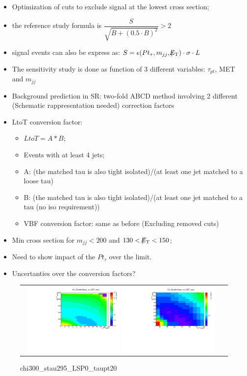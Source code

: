 \begin{itemize}
	\item Optimization of cuts to exclude signal at the lowest cross section;
	\item the reference study formula is $\dfrac{S}{\sqrt{B + (0.5 \cdot B)^{2}}} > 2$
	\item signal events can also be express as: $S = \epsilon ( Pt_{\tau} , m_{jj} ,  \slash\mkern-12mu{E}_{\text{T}} )\cdot \sigma \cdot L$
	\item The sensitivity study is done as function of 3 different variables: $\tau_{pt}$, MET and $m_{jj}$
	\item Background prediction in SR: two-fold ABCD method involving 2 different (Schematic rappresentation needed) correction factors
	\item LtoT conversion factor:
	\begin{itemize}
		\item $LtoT = A * B$;
		\item Events with at least 4 jets;
		\item A: (the matched tau is also tight isolated)/(at least one jet matched to a loose tau)
		\item B: (the matched tau is also tight isolated)/(at least one jet matched to a tau (no iso requirement))
		\item VBF conversion factor: same as before (Excluding removed cuts)
	\end{itemize}
		\item Min cross section for $m_{jj} < 200$ and $130 < \slash\mkern-12mu{E}_{\text{T}} < 150$;
		\item Need to show impact of the $Pt_{\tau}$ over the limit.
		\item Uncertanties over the conversion factors?
\end{itemize}

\begin{figure}[tbh!]
	\centering
	\begin{tabular}{cc}
		\includegraphics[width=0.48\textwidth]{analysis/pics/chi300_stau295_LSP0_taupt20.pdf}
		\includegraphics[width=0.48\textwidth]{analysis/pics/chi300_stau295_LSP0_taupt20_zoom.pdf} 		
	\end{tabular}
	\caption{chi300\_stau295\_LSP0\_taupt20}
\end{figure}

